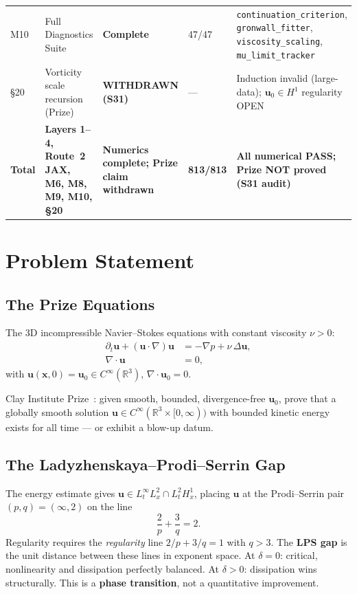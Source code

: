 \documentclass[11pt, a4paper]{article}
\theoremstyle{definition}
\theoremstyle{remark}
\newcommand{\R}{\mathbb{R}}
\newcommand{\delt}{\delta}
\begin{document}
\begin{center}
\begin{tabular}{lllll}
M10 & Full Diagnostics Suite & {\color{passgreen}\textbf{Complete}} & 47/47 & \texttt{continuation\_criterion}, \texttt{gronwall\_fitter}, \texttt{viscosity\_scaling}, \texttt{mu\_limit\_tracker} \\
\S20 & Vorticity scale recursion (Prize) & {\color{failred}\textbf{WITHDRAWN (S31)}} & --- & Induction invalid (large-data); $\mathbf{u}_0\in H^1$ regularity OPEN \\
\midrule
\textbf{Total} & \textbf{Layers 1--4, Route~2 JAX, M6, M8, M9, M10, \S20} & \textbf{Numerics complete; Prize claim withdrawn} & \textbf{813/813} & \textbf{All numerical PASS; Prize NOT proved (S31 audit)} \\
\bottomrule
\end{tabular}
\end{center}

\section{Problem Statement}

\subsection{The Prize Equations}

The 3D incompressible Navier--Stokes equations with constant viscosity $\nu > 0$:
\begin{align}
  \partial_t \mathbf{u} + (\mathbf{u}\cdot\nabla)\mathbf{u}
    &= -\nabla p + \nu\,\Delta\mathbf{u}, \label{eq:ns-momentum} \\
  \nabla \cdot \mathbf{u} &= 0, \label{eq:ns-incompressible}
\end{align}
with $\mathbf{u}(\mathbf{x},0) = \mathbf{u}_0 \in C^\infty(\R^3)$, $\nabla\cdot\mathbf{u}_0 = 0$.

Clay Institute Prize~\cite{clay2000}: given smooth, bounded, divergence-free $\mathbf{u}_0$,
prove that a globally smooth solution $\mathbf{u} \in C^\infty(\R^3\times[0,\infty))$
with bounded kinetic energy exists for all time --- or exhibit a blow-up datum.

\subsection{The Ladyzhenskaya--Prodi--Serrin Gap}

The energy estimate gives $\mathbf{u} \in L^\infty_t L^2_x \cap L^2_t H^1_x$,
placing $\mathbf{u}$ at the Prodi--Serrin pair $(p,q) = (\infty,2)$ on the line
\[
  \frac{2}{p} + \frac{3}{q} = 2.
\]
Regularity requires the \emph{regularity} line $2/p + 3/q = 1$ with $q > 3$.
The \textbf{LPS gap} is the unit distance between these lines in exponent space.
At $\delt = 0$: critical, nonlinearity and dissipation perfectly balanced.
At $\delt > 0$: dissipation wins structurally. This is a \textbf{phase transition},
not a quantitative improvement.
\end{document}
